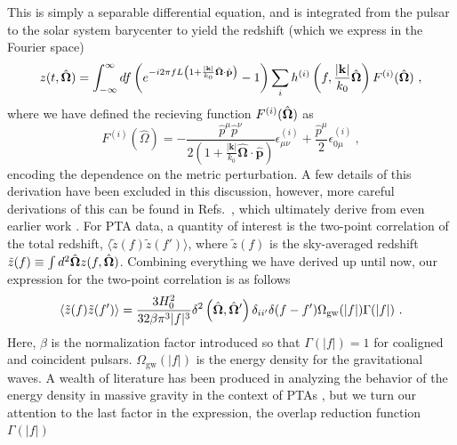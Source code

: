 \documentclass[prd,aps,psfig,nofootinbib,nobibnotes,superscriptaddress,preprintnumbers,times]{revtex4-2}\setlength{\topmargin}{-14mm}
\begin{document}
This is simply a separable differential equation, and is integrated from the pulsar to the solar system barycenter to yield the redshift (which we express in the Fourier space)
\begin{equation}\label{eqn:redshift}
    z(t, \hat{\bf \Omega}) = \int_{-\infty}^\infty df \left(e^{-i2\pi f L\left( 1 + \frac{|{\bf k}|}{k_0} \hat{\bf \Omega}\cdot \hat{\bf p}\right)} - 1\right)\sum_i h^{(i)}\left(f, \frac{|{\bf k}|}{k_0} \hat{\bf \Omega}\right)F^{(i)}(\hat{\bf \Omega}) \ ,
\end{equation}
where we have defined the recieving function $F^{(i)}(\hat{\bf \Omega}) $ as 
\begin{equation}\label{eqn:recieving}
    F^{(i)}(\hat{\Omega}) = -\frac{\hat{p}^\mu \hat{p}^\nu}{2\left(1+\frac{|\boldsymbol{k}|}{k_0} \hat{\boldsymbol{\Omega}} \cdot \hat{\boldsymbol{p}}\right)} \epsilon_{\mu \nu}^{(i)}+\frac{\hat{p}^\mu}{2} \epsilon_{0 \mu}^{(i)} \ ,
\end{equation}
encoding the dependence on the metric perturbation. A few details of this derivation have been excluded in this discussion, however, more careful derivations of this can be found in Refs.\ \cite{Anholm:2008wy, Liang:2021bct}, which ultimately derive from even earlier work \cite{Detweiler:1979wn, Estabrook:1975jtn, Kaufmann:1970}.
For PTA data, a quantity of interest is the two-point correlation of the total redshift, $\langle \tilde{z}(f) \tilde{z}(f') \rangle$, where $\tilde{z}(f)$ is the sky-averaged redshift $\tilde{z}(f) \equiv \int d^2\hat{\bf \Omega} z(f, \hat{\bf \Omega})$. Combining everything we have derived up until now, our expression for the two-point correlation is as follows
\begin{equation}\label{eqn:two_point_z}
    \langle \tilde{z}(f) \tilde{z}(f') \rangle = \frac{3H_0^2}{32 \beta \pi^3|f|^3}\delta^2\left(\hat{\bf \Omega} , \hat{\bf \Omega}'\right)\delta_{ii'}\delta(f - f')\Omega_{\text{gw}}(|f|) \Gamma(|f|) \ .
\end{equation}
Here, $\beta$ is the normalization factor introduced so that $\Gamma(|f|) = 1$ for coaligned and coincident pulsars. $\Omega_{\text{gw}}(|f|)$ is the energy density for the gravitational waves. A wealth of literature has been produced in analyzing the behavior of the energy density in massive gravity in the context of PTAs \cite{Choi:2023tun, Wu:2023rib, Kenjale:2024rsc, He:2021bqm}, but we turn our attention to the last factor in the expression, the overlap reduction function $\Gamma(|f|)$ 
\end{document}
